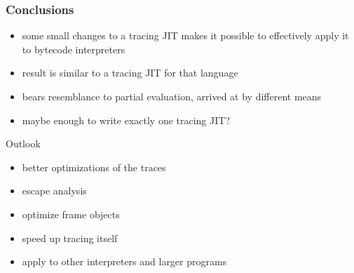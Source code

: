 \documentclass[utf8x]{beamer}
\begin{document}


\begin{frame}
    \frametitle{Conclusions}
    \begin{itemize}
    \item some small changes to a tracing JIT makes it possible to effectively apply it to bytecode interpreters
    \item result is similar to a tracing JIT for that language
    \item bears resemblance to partial evaluation, arrived at by different means
    \item maybe enough to write exactly one tracing JIT?
    \end{itemize}
    \pause
    \begin{block}{Outlook}
        \begin{itemize}
        \item better optimizations of the traces
        \item escape analysis
        \item optimize frame objects
        \item speed up tracing itself
        \item apply to other interpreters and larger programs
        \end{itemize}
    \end{block}
\end{frame}
\end{document}
